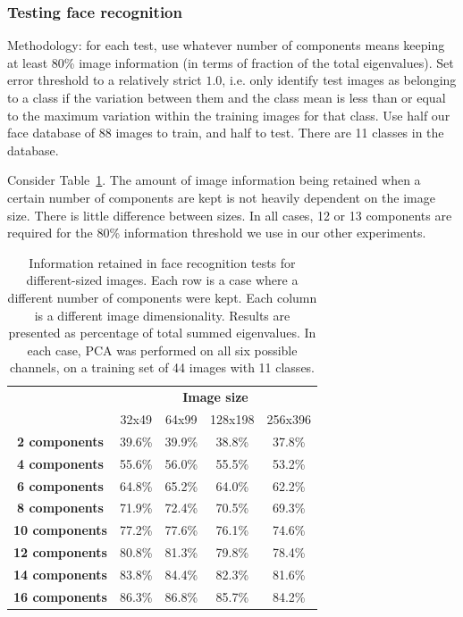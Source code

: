 \subsubsection{Testing face recognition}
\label{sec:pcaresults}

Methodology: for each test, use whatever number of components means keeping at least 80\% image information (in terms of fraction of the total eigenvalues). Set error threshold to a relatively strict $1.0$, i.e. only identify test images as belonging to a class if the variation between them and the class mean is less than or equal to the maximum variation within the training images for that class. Use half our face database of 88 images to train, and half to test. There are 11 classes in the database.

Consider Table~\ref{tbl:face-rec-1}. The amount of image information being retained when a certain number of components are kept is not heavily dependent on the image size. There is little difference between sizes. In all cases, 12 or 13 components are required for the 80\% information threshold we use in our other experiments.

\begin{table}[htbp]
  \centering
  \begin{tabular}{c c c c c}
    \toprule
    & \multicolumn{4}{c}{\textbf{Image size}} \\
      &  32x49  &  64x99  & 128x198 & 256x396 \\
    \midrule
    \textbf{2 components} & 39.6\% & 39.9\% & 38.8\% & 37.8\% \\
    \textbf{4 components} & 55.6\% & 56.0\% & 55.5\% & 53.2\% \\
    \textbf{6 components} & 64.8\% & 65.2\% & 64.0\% & 62.2\% \\
    \textbf{8 components} & 71.9\% & 72.4\% & 70.5\% & 69.3\% \\
    \textbf{10 components} & 77.2\% & 77.6\% & 76.1\% & 74.6\% \\
    \textbf{12 components} & 80.8\% & 81.3\% & 79.8\% & 78.4\% \\
    \textbf{14 components} & 83.8\% & 84.4\% & 82.3\% & 81.6\% \\
    \textbf{16 components} & 86.3\% & 86.8\% & 85.7\% & 84.2\% \\
    \bottomrule
  \end{tabular}
  \caption[Information retained in face recognition tests for different-sized images]{Information retained in face recognition tests for different-sized images. Each row is a case where a different number of components were kept. Each column is a different image dimensionality. Results are presented as percentage of total summed eigenvalues. In each case, PCA was performed on all six possible channels, on a training set of 44 images with 11 classes.}
  \label{tbl:face-rec-1}
\end{table}

